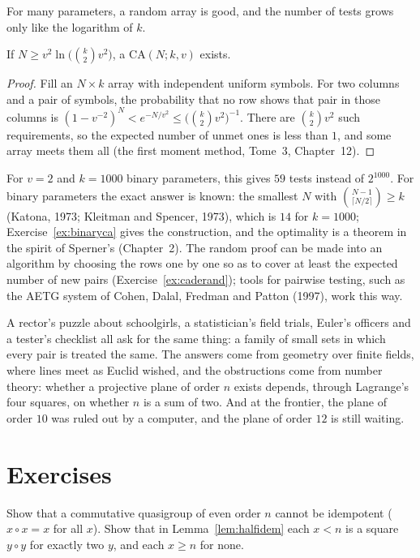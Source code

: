 For many parameters, a random array is good, and the number of tests grows only like the logarithm of $k$.

\begin{theorem}\label{thm:caprob}
If $N\ge v^2\ln\bigl(\binom k2v^2\bigr)$, a $\mathrm{CA}(N;k,v)$ exists.
\end{theorem}
\begin{proof}
Fill an $N\times k$ array with independent uniform symbols. For two columns and a pair of symbols, the probability that no row shows that pair in those columns is $(1-v^{-2})^N<e^{-N/v^2}\le\bigl(\binom k2v^2\bigr)^{-1}$.
There are $\binom k2v^2$ such requirements, so the expected number of unmet ones is less than $1$, and some array meets them all (the first moment method, Tome~3, Chapter~12).
\end{proof}

For $v=2$ and $k=1000$ binary parameters, this gives $59$ tests instead of $2^{1000}$. For binary parameters the exact answer is known: the smallest $N$ with $\binom{N-1}{\lceil N/2\rceil}\ge k$
(Katona, 1973; Kleitman and Spencer, 1973), which is $14$ for $k=1000$; Exercise~\ref{ex:binaryca} gives the construction, and the optimality is a theorem in the spirit of Sperner's (Chapter~2).
The random proof can be made into an algorithm by choosing the rows one by one so as to cover at least the expected number of new pairs (Exercise~\ref{ex:caderand}); tools for pairwise
testing, such as the AETG system of Cohen, Dalal, Fredman and Patton (1997), work this way.

\begin{beauty}
A rector's puzzle about schoolgirls, a statistician's field trials, Euler's officers and a tester's checklist all ask for the same thing: a family of small sets in which every pair is treated
the same. The answers come from geometry over finite fields, where lines meet as Euclid wished, and the obstructions come from number theory: whether a projective plane of order $n$ exists depends,
through Lagrange's four squares, on whether $n$ is a sum of two. And at the frontier, the plane of order $10$ was ruled out by a computer, and the plane of order $12$ is still waiting.
\end{beauty}

\section{Exercises}

\begin{exercise}[$\star$]\label{ex:idempotent}
Show that a commutative quasigroup of even order $n$ cannot be idempotent ($x\circ x=x$ for all $x$). Show that in Lemma~\ref{lem:halfidem} each $x<n$ is a square $y\circ y$ for exactly two $y$, and each $x\ge n$ for none.
\end{exercise}

